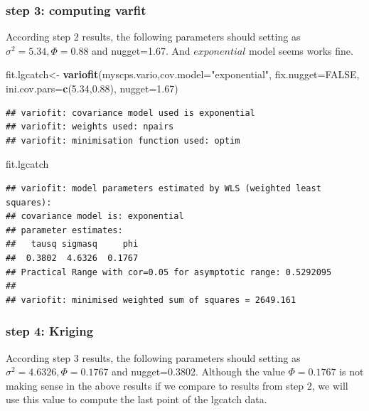 \documentclass[]{article}
\newenvironment{Shaded}{\begin{snugshade}}{\end{snugshade}}
\newcommand{\KeywordTok}[1]{\textcolor[rgb]{0.13,0.29,0.53}{\textbf{#1}}}
\newcommand{\DataTypeTok}[1]{\textcolor[rgb]{0.13,0.29,0.53}{#1}}
\newcommand{\FloatTok}[1]{\textcolor[rgb]{0.00,0.00,0.81}{#1}}
\newcommand{\StringTok}[1]{\textcolor[rgb]{0.31,0.60,0.02}{#1}}
\newcommand{\OtherTok}[1]{\textcolor[rgb]{0.56,0.35,0.01}{#1}}
\newcommand{\NormalTok}[1]{#1}
\begin{document}
\subsubsection{step 3: computing varfit}\label{step-3-computing-varfit}

According step 2 results, the following parameters should setting as
\(\sigma^2=5.34,\Phi=0.88\) and nugget=1.67. And \(exponential\) model
seems works fine.

\begin{Shaded}
\begin{Highlighting}[]
\NormalTok{fit.lgcatch<-}\StringTok{ }\KeywordTok{variofit}\NormalTok{(myscps.vario,}\DataTypeTok{cov.model=}\StringTok{"exponential"}\NormalTok{,}
                       \DataTypeTok{fix.nugget=}\OtherTok{FALSE}\NormalTok{, }\DataTypeTok{ini.cov.pars=}\KeywordTok{c}\NormalTok{(}\FloatTok{5.34}\NormalTok{,}\FloatTok{0.88}\NormalTok{), }
                       \DataTypeTok{nugget=}\FloatTok{1.67}\NormalTok{)}
\end{Highlighting}
\end{Shaded}

\begin{verbatim}
## variofit: covariance model used is exponential 
## variofit: weights used: npairs 
## variofit: minimisation function used: optim
\end{verbatim}

\begin{Shaded}
\begin{Highlighting}[]
\NormalTok{fit.lgcatch}
\end{Highlighting}
\end{Shaded}

\begin{verbatim}
## variofit: model parameters estimated by WLS (weighted least squares):
## covariance model is: exponential
## parameter estimates:
##   tausq sigmasq     phi 
##  0.3802  4.6326  0.1767 
## Practical Range with cor=0.05 for asymptotic range: 0.5292095
## 
## variofit: minimised weighted sum of squares = 2649.161
\end{verbatim}

\subsubsection{step 4: Kriging}\label{step-4-kriging}

According step 3 results, the following parameters should setting as
\(\sigma^2=4.6326,\Phi=0.1767\) and nugget=0.3802. Although the value
\(\Phi=0.1767\) is not making sense in the above results if we compare
to results from step 2, we will use this value to compute the last point
of the lgcatch data.
\end{document}
